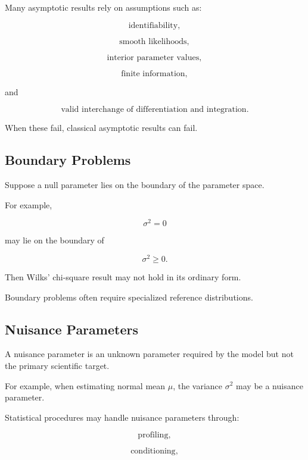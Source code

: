 Many asymptotic results rely on assumptions such as:

\[
\boxed{
\text{identifiability},
}
\]

\[
\boxed{
\text{smooth likelihoods},
}
\]

\[
\boxed{
\text{interior parameter values},
}
\]

\[
\boxed{
\text{finite information},
}
\]

and

\[
\boxed{
\text{valid interchange of differentiation and integration}.
}
\]

When these fail, classical asymptotic results can fail.

\subsection{Boundary Problems}
\label{subsec:parameter-boundary-problems}

Suppose a null parameter lies on the boundary of the parameter space.

For example,

\[
\sigma^2=0
\]

may lie on the boundary of

\[
\sigma^2\geq0.
\]

Then Wilks' chi-square result may not hold in its ordinary form.

Boundary problems often require specialized reference distributions.

\subsection{Nuisance Parameters}
\label{subsec:nuisance-parameters-mathstat}

A nuisance parameter is an unknown parameter required by the model but
not the primary scientific target.

For example, when estimating normal mean \(\mu\), the variance
\(\sigma^2\) may be a nuisance parameter.

Statistical procedures may handle nuisance parameters through:

\[
\boxed{
\text{profiling},
}
\]

\[
\boxed{
\text{conditioning},
}
\]

